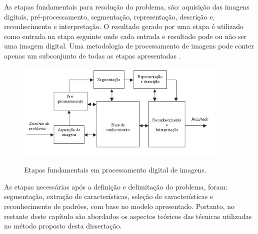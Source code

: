 As etapas fundamentais para resolução do problema, são\cite{gonzalez2010processamento}: aquisição das imagens digitais, pré-processamento, segmentação, representação, descrição e, reconhecimento e interpretação. O resultado gerado por uma etapa é utilizado como entrada na etapa seguinte onde cada entrada e resultado pode ou não ser uma imagem digital. Uma metodologia de processamento de imagens pode conter apenas um subconjunto de todas as etapas apresentadas \cite{BRAZ:2014}.

\begin{figure}[ht!]    
	\centering
	\caption{Etapas fundamentais em processamento digital de imagens.}
	\includegraphics[width=0.90\textwidth]{figs/passosProcessamentoImagens.png}
	\label{fig:passosProcessamentoImagens}
\end{figure}

As etapas necessárias após a definição e delimitação do problema, foram: segmentação, extração de características, seleção de características e reconhecimento de padrões, com base no modelo apresentado. Portanto, no restante deste capítulo são abordados os aspectos teóricos das técnicas utilizadas no método proposto desta dissertação.

